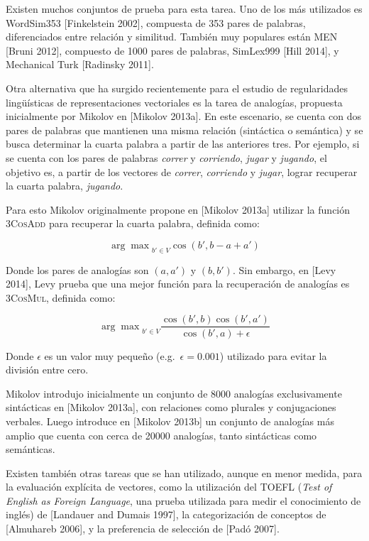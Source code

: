 Existen muchos conjuntos de prueba para esta tarea. Uno de los más utilizados es WordSim353
[Finkelstein 2002], compuesta de 353 pares de palabras, diferenciados entre relación y
similitud. También muy populares están MEN [Bruni 2012], compuesto de 1000 pares de palabras,
SimLex999 [Hill 2014], y Mechanical Turk [Radinsky 2011].

Otra alternativa que ha surgido recientemente para el estudio de regularidades lingüísticas de
representaciones vectoriales es la tarea de analogías, propuesta inicialmente por Mikolov en
[Mikolov 2013a]. En este escenario, se cuenta con dos pares de palabras que mantienen una misma
relación (sintáctica o semántica) y se busca determinar la cuarta palabra a partir de las anteriores
tres. Por ejemplo, si se cuenta con los pares de palabras \textit{correr} y \textit{corriendo},
\textit{jugar} y \textit{jugando}, el objetivo es, a partir de los vectores de \textit{correr},
\textit{corriendo} y \textit{jugar}, lograr recuperar la cuarta palabra, \textit{jugando}.

Para esto Mikolov originalmente propone en [Mikolov 2013a] utilizar la función \textsc{3CosAdd} para
recuperar la cuarta palabra, definida como:

\[
  {\arg \max}_{b' \in V} \cos(b', b - a + a')
\]

Donde los pares de analogías son $(a, a')$ y $(b, b')$. Sin embargo, en [Levy 2014], Levy prueba que
una mejor función para la recuperación de analogías es \textsc{3CosMul}, definida como:

\[
  {\arg \max}_{b' \in V} \frac{\cos(b', b) \cos(b', a')}{\cos(b', a) + \epsilon}
\]

Donde $\epsilon$ es un valor muy pequeño (e.g.\ $\epsilon = 0.001$) utilizado para evitar la
división entre cero.

Mikolov introdujo inicialmente un conjunto de 8000 analogías exclusivamente sintácticas en [Mikolov
2013a], con relaciones como plurales y conjugaciones verbales. Luego introduce en [Mikolov 2013b] un
conjunto de analogías más amplio que cuenta con cerca de 20000 analogías, tanto sintácticas como
semánticas.

Existen también otras tareas que se han utilizado, aunque en menor medida, para la evaluación
explícita de vectores, como la utilización del TOEFL (\textit{Test of English as Foreign Language},
una prueba utilizada para medir el conocimiento de inglés) de [Landauer and Dumais 1997], la
categorización de conceptos de [Almuhareb 2006], y la preferencia de selección de [Padó 2007].


